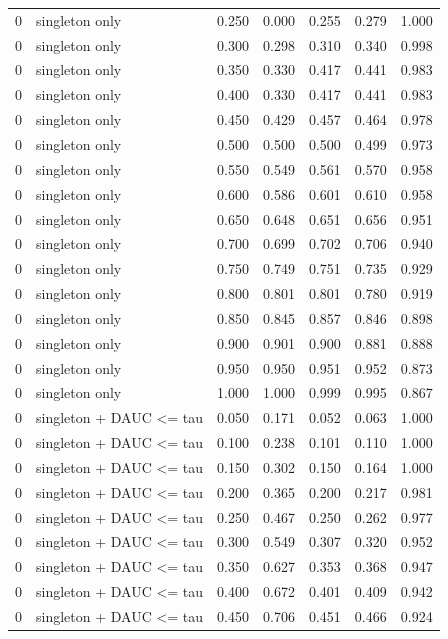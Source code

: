 \begin{tabular}{rlrrrrr}
0 & singleton only & 0.250 & 0.000 & 0.255 & 0.279 & 1.000 \\
0 & singleton only & 0.300 & 0.298 & 0.310 & 0.340 & 0.998 \\
0 & singleton only & 0.350 & 0.330 & 0.417 & 0.441 & 0.983 \\
0 & singleton only & 0.400 & 0.330 & 0.417 & 0.441 & 0.983 \\
0 & singleton only & 0.450 & 0.429 & 0.457 & 0.464 & 0.978 \\
0 & singleton only & 0.500 & 0.500 & 0.500 & 0.499 & 0.973 \\
0 & singleton only & 0.550 & 0.549 & 0.561 & 0.570 & 0.958 \\
0 & singleton only & 0.600 & 0.586 & 0.601 & 0.610 & 0.958 \\
0 & singleton only & 0.650 & 0.648 & 0.651 & 0.656 & 0.951 \\
0 & singleton only & 0.700 & 0.699 & 0.702 & 0.706 & 0.940 \\
0 & singleton only & 0.750 & 0.749 & 0.751 & 0.735 & 0.929 \\
0 & singleton only & 0.800 & 0.801 & 0.801 & 0.780 & 0.919 \\
0 & singleton only & 0.850 & 0.845 & 0.857 & 0.846 & 0.898 \\
0 & singleton only & 0.900 & 0.901 & 0.900 & 0.881 & 0.888 \\
0 & singleton only & 0.950 & 0.950 & 0.951 & 0.952 & 0.873 \\
0 & singleton only & 1.000 & 1.000 & 0.999 & 0.995 & 0.867 \\
0 & singleton + DAUC <= tau & 0.050 & 0.171 & 0.052 & 0.063 & 1.000 \\
0 & singleton + DAUC <= tau & 0.100 & 0.238 & 0.101 & 0.110 & 1.000 \\
0 & singleton + DAUC <= tau & 0.150 & 0.302 & 0.150 & 0.164 & 1.000 \\
0 & singleton + DAUC <= tau & 0.200 & 0.365 & 0.200 & 0.217 & 0.981 \\
0 & singleton + DAUC <= tau & 0.250 & 0.467 & 0.250 & 0.262 & 0.977 \\
0 & singleton + DAUC <= tau & 0.300 & 0.549 & 0.307 & 0.320 & 0.952 \\
0 & singleton + DAUC <= tau & 0.350 & 0.627 & 0.353 & 0.368 & 0.947 \\
0 & singleton + DAUC <= tau & 0.400 & 0.672 & 0.401 & 0.409 & 0.942 \\
0 & singleton + DAUC <= tau & 0.450 & 0.706 & 0.451 & 0.466 & 0.924 \\

\end{tabular}
